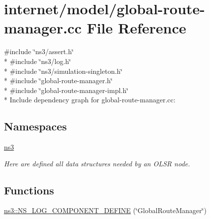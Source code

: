 \hypertarget{global-route-manager_8cc}{}\section{internet/model/global-\/route-\/manager.cc File Reference}
\label{global-route-manager_8cc}
{\ttfamily \#include \char`\"{}ns3/assert.\+h\char`\"{}}\\*
{\ttfamily \#include \char`\"{}ns3/log.\+h\char`\"{}}\\*
{\ttfamily \#include \char`\"{}ns3/simulation-\/singleton.\+h\char`\"{}}\\*
{\ttfamily \#include \char`\"{}global-\/route-\/manager.\+h\char`\"{}}\\*
{\ttfamily \#include \char`\"{}global-\/route-\/manager-\/impl.\+h\char`\"{}}\\*
Include dependency graph for global-\/route-\/manager.cc\+:
\subsection*{Namespaces}
\begin{DoxyCompactItemize}
\item 
 \hyperlink{namespacens3}{ns3}
\begin{DoxyCompactList}\small\item\em Here are defined all data structures needed by an O\+L\+SR node. \end{DoxyCompactList}\end{DoxyCompactItemize}
\subsection*{Functions}
\begin{DoxyCompactItemize}
\item 
\hyperlink{namespacens3_a2ec37c2ece880396b9fb098d42909b57}{ns3\+::\+N\+S\+\_\+\+L\+O\+G\+\_\+\+C\+O\+M\+P\+O\+N\+E\+N\+T\+\_\+\+D\+E\+F\+I\+NE} (\char`\"{}Global\+Route\+Manager\char`\"{})
\end{DoxyCompactItemize}

